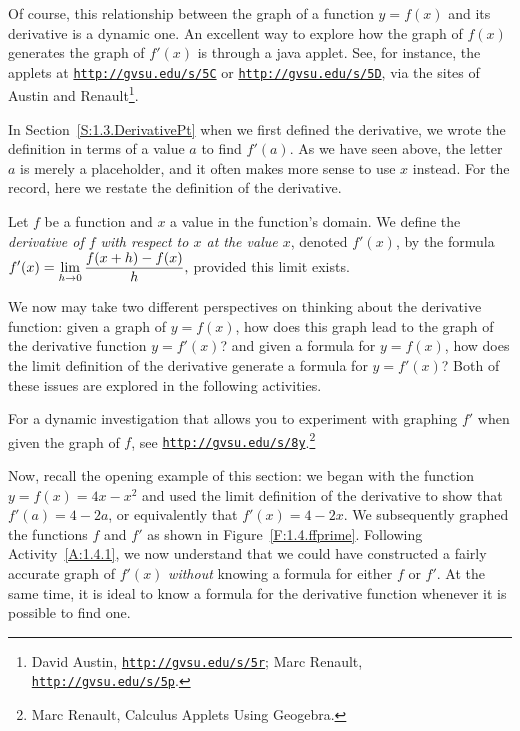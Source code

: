 Of course, this relationship between the graph of a function $y = f(x)$ and its derivative is a dynamic one.  An excellent way to explore how the graph of $f(x)$ generates the graph of $f'(x)$ is through a java applet.  See, for instance, the applets at \href{http://gvsu.edu/s/5C}{\texttt{http://gvsu.edu/s/5C}} or \href{http://gvsu.edu/s/5D}{\texttt{http://gvsu.edu/s/5D}}, via the sites of Austin and Renault\footnote{David Austin, \href{http://gvsu.edu/s/5r}{\texttt{http://gvsu.edu/s/5r}}; Marc Renault, \href{http://gvsu.edu/s/5p}{\texttt{http://gvsu.edu/s/5p}}.}.

In Section~\ref{S:1.3.DerivativePt} when we first defined the derivative, we wrote the definition in terms of a value $a$ to find $f'(a)$.  As we have seen above, the letter $a$ is merely a placeholder, and it often makes more sense to use $x$ instead.  For the record, here we restate the  definition of the derivative.
\begin{definition} \label{D:derivativedefnx}
Let $f$ be a function and $x$ a value in the function's domain.  We define the \emph{derivative of $f$ with respect to $x$ at the value $x$}, denoted $f'(x)$, by the formula
$\displaystyle f'(x) = \lim_{h \to 0} \frac{f(x+h)-f(x)}{h},$
provided this limit exists.
\end{definition}

We now may take two different perspectives on thinking about the derivative function:  given a graph of $y = f(x)$, how does this graph lead to the graph of the derivative function $y = f'(x)$?  and given a formula for $y = f(x)$, how does the limit definition of the derivative generate a formula for $y = f'(x)$?  Both of these issues are explored in the following activities. 



For a dynamic investigation that allows you to experiment with graphing $f'$ when given the graph of $f$, see \href{http://gvsu.edu/s/8y}{\texttt{http://gvsu.edu/s/8y}}.\footnote{Marc Renault, Calculus Applets Using Geogebra.}

Now, recall the opening example of this section:  we began with the function $y = f(x) = 4x - x^2$ and used the limit definition of the derivative to show that $f'(a) = 4 - 2a$, or equivalently that $f'(x) = 4 - 2x$.  We subsequently graphed the functions $f$ and $f'$ as shown in Figure~\ref{F:1.4.ffprime}.  Following Activity~\ref{A:1.4.1}, we now understand that we could have constructed a fairly accurate graph of $f'(x)$ \emph{without} knowing a formula for either $f$ or $f'$.  At the same time, it is ideal to know a formula for the derivative function whenever it is possible to find one.

